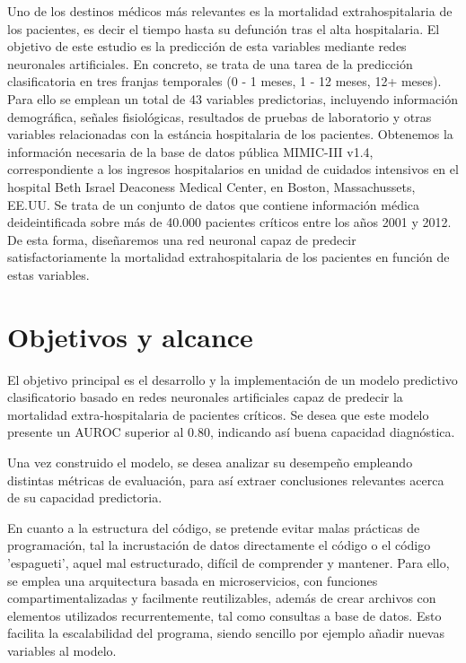 \documentclass{report}
\begin{document}
Uno de los destinos médicos más relevantes es la mortalidad extrahospitalaria de los pacientes, es decir el tiempo hasta su defunción tras el alta hospitalaria. El objetivo de este estudio es la predicción de esta variables mediante redes neuronales artificiales. En concreto, se trata de una tarea de la predicción clasificatoria en tres franjas temporales (0 - 1 meses, 1 - 12 meses, 12+ meses). Para ello se emplean un total de 43 variables predictorias, incluyendo información demográfica, señales fisiológicas, resultados de pruebas de laboratorio y otras variables relacionadas con la estáncia hospitalaria de los pacientes. Obtenemos la información necesaria de la base de datos pública MIMIC-III v1.4, correspondiente a los ingresos hospitalarios en unidad de cuidados intensivos en el hospital Beth Israel Deaconess Medical Center, en Boston, Massachussets, EE.UU. Se trata de un conjunto de datos que contiene información médica deideintificada sobre más de 40.000 pacientes críticos entre los años 2001 y 2012. De esta forma, diseñaremos una red neuronal capaz de predecir satisfactoriamente la mortalidad extrahospitalaria de los pacientes en función de estas variables.


\section{Objetivos y alcance}

El objetivo principal es el desarrollo y la implementación de un modelo predictivo clasificatorio basado en redes neuronales artificiales capaz de predecir la mortalidad extra-hospitalaria de pacientes críticos. Se desea que este modelo presente un AUROC superior al 0.80, indicando así buena capacidad diagnóstica. 

Una vez construido el modelo, se desea analizar su desempeño empleando distintas métricas de evaluación, para así extraer conclusiones relevantes acerca de su capacidad predictoria.

En cuanto a la estructura del código, se pretende evitar malas prácticas de programación, tal la incrustación de datos directamente el código o el código 'espagueti', aquel mal estructurado, difícil de comprender y mantener. Para ello, se emplea una arquitectura basada en microservicios, con funciones compartimentalizadas y facilmente reutilizables, además de crear archivos con elementos utilizados recurrentemente, tal como consultas a base de datos. Esto facilita la  escalabilidad del programa, siendo sencillo por ejemplo añadir nuevas variables al modelo.
\end{document}
